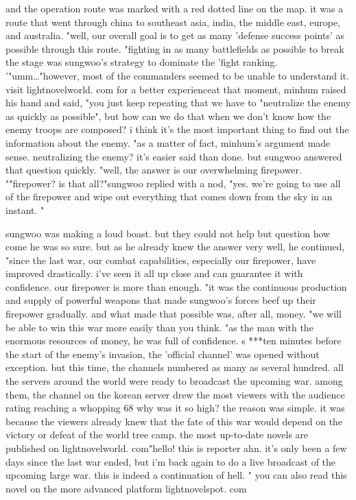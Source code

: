 and the operation route was marked with a red dotted line on the map.
 it was a route that went through china to southeast asia, india, the middle east, europe, and australia.
"well, our overall goal is to get as many 'defense success points' as possible through this route.
"fighting in as many battlefields as possible to break the stage was sungwoo's strategy to dominate the 'fight ranking.
'"umm…"however, most of the commanders seemed to be unable to understand it.
visit lightnovelworld.
com for a better experienceat that moment, minhum raised his hand and said, "you just keep repeating that we have to "neutralize the enemy as quickly as possible", but how can we do that when we don't know how the enemy troops are composed? i think it's the most important thing to find out the information about the enemy.
"as a matter of fact, minhum's argument made sense.
 neutralizing the enemy? it's easier said than done.
but sungwoo answered that question quickly.
"well, the answer is our overwhelming firepower.
""firepower? is that all?"sungwoo replied with a nod, "yes.
 we're going to use all of the firepower and wipe out everything that comes down from the sky in an instant.
"

sungwoo was making a loud boast.
 but they could not help but question how come he was so sure.
but as he already knew the answer very well, he continued, "since the last war, our combat capabilities, especially our firepower, have improved drastically.
 i've seen it all up close and can guarantee it with confidence.
 our firepower is more than enough.
"it was the continuous production and supply of powerful weapons that made sungwoo's forces beef up their firepower gradually.
 and what made that possible was, after all, money.
"we will be able to win this war more easily than you think.
"as the man with the enormous resources of money, he was full of confidence.
s ***ten minutes before the start of the enemy's invasion, the 'official channel' was opened without exception.
 but this time, the channels numbered as many as several hundred.
 all the servers around the world were ready to broadcast the upcoming war.
among them, the channel on the korean server drew the most viewers with the audience rating reaching a whopping 68%
why was it so high? the reason was simple.
 it was because the viewers already knew that the fate of this war would depend on the victory or defeat of the world tree camp.
the most up-to-date novels are published on lightnovelworld.
com"hello! this is reporter ahn.
 it's only been a few days since the last war ended, but i'm back again to do a live broadcast of the upcoming large war.
 this is indeed a continuation of hell.
" you can also read this novel on the more advanced platform lightnovelspot.
com

 